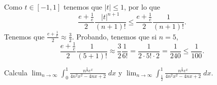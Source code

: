 \documentclass{article}
\begin{document}
\begin{sol}
Como $\displaystyle t \in \left[-1,1\right]  $ tenemos que $\displaystyle \left|t\right| \leq 1 $, por lo que 
\[\frac{e+\frac{1}{e}}{2} \frac{ \left|t\right|^{n+1}}{\left(n+1\right)!} \leq \frac{e + \frac{1}{e}}{2}\frac{1}{\left(n+1\right)!} .\]
Tenemos que $\displaystyle \frac{e+\frac{1}{e}}{2} \approx \frac{3}{2} $. Probando, tenemos que si $\displaystyle n = 5 $,
\[\frac{e + \frac{1}{e}}{2}\frac{1}{\left(5+1\right)!} \approx \frac{3}{2}\frac{1}{6!} = \frac{1}{2 \cdot 5! \cdot 2} = \frac{1}{240} \leq \frac{1}{100} .\]
\end{sol}
\begin{ej}
	Calcula $\displaystyle \lim_{n \to \infty }\int^{1}_{0} \frac{n^{\frac{3}{2}}e^{x}}{4n^{2}x^{2}-4nx+2} \; dx $ y $\displaystyle \lim_{n \to \infty}\int^{1}_{\frac{1}{2}}  \frac{n^{\frac{3}{2}}e^{x}}{4n^{2}x^{2}-4nx+2} \; dx $. 
\end{ej}
\end{document}
